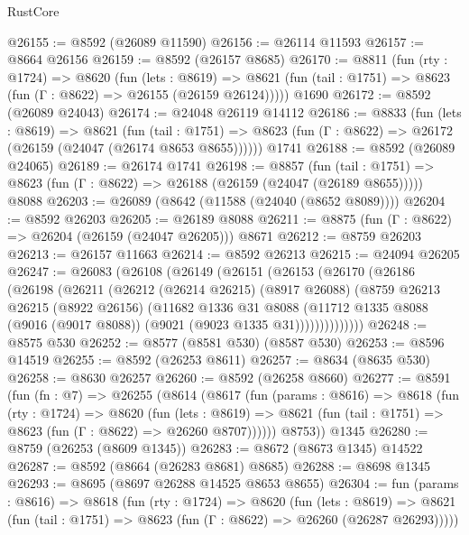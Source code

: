 \begin{lexlean}{RustCore}
\begin{coremodule}
@26155 := @8592 (@26089 @11590)
@26156 := @26114 @11593
@26157 := @8664 @26156
@26159 := @8592 (@26157 @8685)
@26170 := @8811
    (fun (rty : @1724) =>
    @8620
      (fun (lets : @8619) =>
      @8621 (fun (tail : @1751) => @8623 (fun (Γ : @8622) => @26155 (@26159 @26124)))))
    @1690
@26172 := @8592 (@26089 @24043)
@26174 := @24048 @26119 @14112
@26186 := @8833
    (fun (lets : @8619) =>
    @8621
      (fun (tail : @1751) =>
      @8623 (fun (Γ : @8622) => @26172 (@26159 (@24047 (@26174 @8653 @8655))))))
    @1741
@26188 := @8592 (@26089 @24065)
@26189 := @26174 @1741
@26198 := @8857
    (fun (tail : @1751) => @8623 (fun (Γ : @8622) => @26188 (@26159 (@24047 (@26189 @8655)))))
    @8088
@26203 := @26089 (@8642 (@11588 (@24040 (@8652 @8089))))
@26204 := @8592 @26203
@26205 := @26189 @8088
@26211 := @8875 (fun (Γ : @8622) => @26204 (@26159 (@24047 @26205))) @8671
@26212 := @8759 @26203
@26213 := @26157 @11663
@26214 := @8592 @26213
@26215 := @24094 @26205
@26247 := @26083
    (@26108
      (@26149
        (@26151
          (@26153
            (@26170
              (@26186
                (@26198
                  (@26211
                    (@26212
                      (@26214 @26215)
                      (@8917 @26088)
                      (@8759
                        @26213
                        @26215
                        (@8922 @26156)
                        (@11682
                          @1336
                          @31
                          @8088
                          (@11712
                            @1335
                            @8088
                            (@9016 (@9017 @8088))
                            (@9021 (@9023 @1335 @31))))))))))))))
@26248 := @8575 @530
@26252 := @8577 (@8581 @530) (@8587 @530)
@26253 := @8596 @14519
@26255 := @8592 (@26253 @8611)
@26257 := @8634 (@8635 @530)
@26258 := @8630 @26257
@26260 := @8592 (@26258 @8660)
@26277 := @8591
    (fun (fn : @7) =>
    @26255
      (@8614
        (@8617
          (fun (params : @8616) =>
          @8618
            (fun (rty : @1724) =>
            @8620
              (fun (lets : @8619) =>
              @8621 (fun (tail : @1751) => @8623 (fun (Γ : @8622) => @26260 @8707))))))
        @8753))
    @1345
@26280 := @8759 (@26253 (@8609 @1345))
@26283 := @8672 (@8673 @1345) @14522
@26287 := @8592 (@8664 (@26283 @8681) @8685)
@26288 := @8698 @1345
@26293 := @8695 (@8697 @26288 @14525 @8653 @8655)
@26304 := fun (params : @8616) =>
  @8618
    (fun (rty : @1724) =>
    @8620
      (fun (lets : @8619) =>
      @8621 (fun (tail : @1751) => @8623 (fun (Γ : @8622) => @26260 (@26287 @26293)))))

\end{coremodule}
\end{lexlean}
